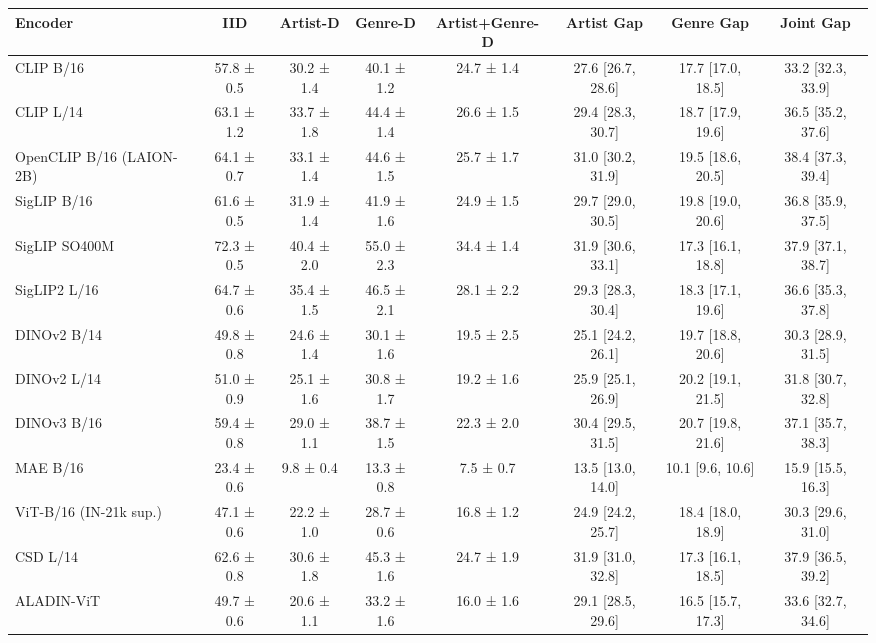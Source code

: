 \begin{tabular}{lccccccc}
\toprule
Encoder & IID & Artist-D & Genre-D & Artist+Genre-D & Artist Gap & Genre Gap & Joint Gap \\
\midrule
CLIP B/16 & 57.8 ± 0.5 & 30.2 ± 1.4 & 40.1 ± 1.2 & 24.7 ± 1.4 & 27.6 [26.7, 28.6] & 17.7 [17.0, 18.5] & 33.2 [32.3, 33.9] \\
CLIP L/14 & 63.1 ± 1.2 & 33.7 ± 1.8 & 44.4 ± 1.4 & 26.6 ± 1.5 & 29.4 [28.3, 30.7] & 18.7 [17.9, 19.6] & 36.5 [35.2, 37.6] \\
OpenCLIP B/16 (LAION-2B) & 64.1 ± 0.7 & 33.1 ± 1.4 & 44.6 ± 1.5 & 25.7 ± 1.7 & 31.0 [30.2, 31.9] & 19.5 [18.6, 20.5] & 38.4 [37.3, 39.4] \\
SigLIP B/16 & 61.6 ± 0.5 & 31.9 ± 1.4 & 41.9 ± 1.6 & 24.9 ± 1.5 & 29.7 [29.0, 30.5] & 19.8 [19.0, 20.6] & 36.8 [35.9, 37.5] \\
SigLIP SO400M & 72.3 ± 0.5 & 40.4 ± 2.0 & 55.0 ± 2.3 & 34.4 ± 1.4 & 31.9 [30.6, 33.1] & 17.3 [16.1, 18.8] & 37.9 [37.1, 38.7] \\
SigLIP2 L/16 & 64.7 ± 0.6 & 35.4 ± 1.5 & 46.5 ± 2.1 & 28.1 ± 2.2 & 29.3 [28.3, 30.4] & 18.3 [17.1, 19.6] & 36.6 [35.3, 37.8] \\
DINOv2 B/14 & 49.8 ± 0.8 & 24.6 ± 1.4 & 30.1 ± 1.6 & 19.5 ± 2.5 & 25.1 [24.2, 26.1] & 19.7 [18.8, 20.6] & 30.3 [28.9, 31.5] \\
DINOv2 L/14 & 51.0 ± 0.9 & 25.1 ± 1.6 & 30.8 ± 1.7 & 19.2 ± 1.6 & 25.9 [25.1, 26.9] & 20.2 [19.1, 21.5] & 31.8 [30.7, 32.8] \\
DINOv3 B/16 & 59.4 ± 0.8 & 29.0 ± 1.1 & 38.7 ± 1.5 & 22.3 ± 2.0 & 30.4 [29.5, 31.5] & 20.7 [19.8, 21.6] & 37.1 [35.7, 38.3] \\
MAE B/16 & 23.4 ± 0.6 & 9.8 ± 0.4 & 13.3 ± 0.8 & 7.5 ± 0.7 & 13.5 [13.0, 14.0] & 10.1 [9.6, 10.6] & 15.9 [15.5, 16.3] \\
ViT-B/16 (IN-21k sup.) & 47.1 ± 0.6 & 22.2 ± 1.0 & 28.7 ± 0.6 & 16.8 ± 1.2 & 24.9 [24.2, 25.7] & 18.4 [18.0, 18.9] & 30.3 [29.6, 31.0] \\
CSD L/14 & 62.6 ± 0.8 & 30.6 ± 1.8 & 45.3 ± 1.6 & 24.7 ± 1.9 & 31.9 [31.0, 32.8] & 17.3 [16.1, 18.5] & 37.9 [36.5, 39.2] \\
ALADIN-ViT & 49.7 ± 0.6 & 20.6 ± 1.1 & 33.2 ± 1.6 & 16.0 ± 1.6 & 29.1 [28.5, 29.6] & 16.5 [15.7, 17.3] & 33.6 [32.7, 34.6] \\
\bottomrule
\end{tabular}
